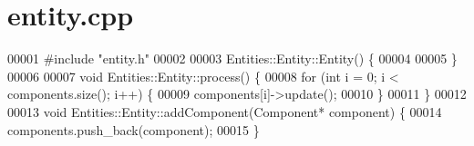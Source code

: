\section{entity.\+cpp}
\label{entity_8cpp_source}

\begin{DoxyCode}
00001 \textcolor{preprocessor}{#include "entity.h"}
00002 
00003 Entities::Entity::Entity() \{
00004     
00005 \}
00006 
00007 \textcolor{keywordtype}{void} Entities::Entity::process() \{
00008     \textcolor{keywordflow}{for} (\textcolor{keywordtype}{int} i = 0; i < components.size(); i++) \{
00009         components[i]->update();
00010     \}
00011 \}
00012 
00013 \textcolor{keywordtype}{void} Entities::Entity::addComponent(Component* component) \{
00014     components.push\_back(component);
00015 \}
\end{DoxyCode}
